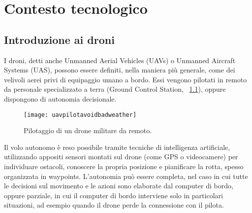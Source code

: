 
\chapter{Contesto tecnologico} \label{chap:tecnologico}

\ifpdf
    \graphicspath{{Chapter2/Figs/Raster/}{Chapter2/Figs/PDF/}{Chapter2/Figs/}}
\else
    \graphicspath{{Chapter2/Figs/Vector/}{Chapter2/Figs/}}
\fi


\section[Introduzione ai droni]{Introduzione ai droni}
I droni, detti anche Unmanned Aerial Vehicles (UAVs) o Unmanned Aircraft Systems (UAS), possono essere definiti, nella maniera più generale, come dei velivoli aerei privi di equipaggio umano a bordo. Essi vengono pilotati in remoto da personale specializzato a terra (Ground Control Station, \figurename\ \ref{fig:uavpilotavoidbadweather}), oppure dispongono di autonomia decisionale. 
%
\begin{figure}
	\begin{center}
		\texttt{[image: uavpilotavoidbadweather]}
	\end{center}
	\caption{Pilotaggio di un drone militare da remoto.\label{fig:uavpilotavoidbadweather}}
\end{figure}
%
Il volo autonomo è reso possibile tramite tecniche di intelligenza artificiale, utilizzando appositi sensori montati sul drone (come GPS o videocamere) per individuare ostacoli, conoscere la propria posizione e pianificare la rotta, spesso organizzata in waypoints. 
L'autonomia può essere completa, nel caso in cui tutte le decisioni sul movimento e le azioni sono elaborate dal computer di bordo, oppure parziale, in cui il computer di bordo interviene solo in particolari situazioni, ad esempio quando il drone perde la connessione con il pilota. \\

